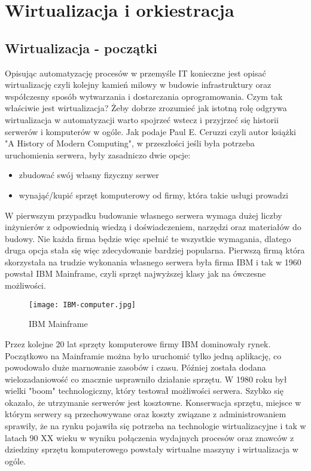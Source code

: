\section{Wirtualizacja i orkiestracja}

\subsection{Wirtualizacja - początki}
Opisując automatyzację procesów w przemyśle IT konieczne jest opisać wirtualizację czyli kolejny kamień milowy w budowie infrastruktury oraz współczesny sposób wytwarzania i dostarczania oprogramowania. Czym tak właściwie jest wirtualizacja? 
Żeby dobrze zrozumieć jak istotną rolę odgrywa wirtualizacja w automatyzacji warto spojrzeć wstecz i przyjrzeć się historii serwerów i komputerów w ogóle.   Jak podaje Paul E. Ceruzzi czyli autor książki "A History of Modern Computing", w przeszłości jeśli była potrzeba uruchomienia serwera, były zasadniczo dwie opcje: 
\begin{itemize}
    \item zbudować swój własny fizyczny serwer
    \item wynająć/kupić sprzęt komputerowy od firmy, która takie usługi prowadzi
\end{itemize}
W pierwszym przypadku budowanie własnego serwera wymaga dużej liczby inżynierów z odpowiednią wiedzą i doświadczeniem, narzędzi oraz materiałów do budowy. Nie każda firma będzie więc spełnić te wszystkie wymagania, dlatego druga opcja stała się więc zdecydowanie bardziej popularna. Pierwszą firmą która skorzystała na trudzie wykonania własnego serwera była firma IBM i tak w 1960 powstał IBM Mainframe, czyli sprzęt najwyższej klasy jak na  ówczesne możliwości.

\begin{figure}[htbp]
    \centering
    \texttt{[image: IBM-computer.jpg]}
    \caption{IBM Mainframe}
    \label{fig:ibm-mainframe}
\end{figure}

Przez kolejne 20 lat sprzęty komputerowe firmy IBM dominowały rynek. Początkowo na Mainframie można było uruchomić tylko jedną aplikację, co powodowało duże marnowanie zasobów i czasu. Później została dodana wielozadaniowość co znacznie usprawniło działanie sprzętu. W 1980 roku był wielki "boom" technologiczny, który testował możliwości serwera. Szybko się okazało, że utrzymanie serwerów jest kosztowne. Konserwacja sprzętu, miejsce w którym serwery są przechowywane oraz koszty związane z administrowaniem sprawiły, że na rynku pojawiła się potrzeba na technologie wirtualizacyjne i tak w latach 90 XX wieku w wyniku połączenia wydajnych procesów oraz znawców z dziedziny sprzętu komputerowego powstały wirtualne maszyny i wirtualizacja w ogóle. 

